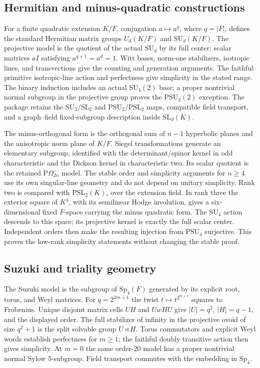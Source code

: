 \documentclass[11pt]{article}
\numberwithin{equation}{section}
\theoremstyle{definition}
\newcommand{\SL}{\mathrm{SL}}
\newcommand{\PSL}{\mathrm{PSL}}
\newcommand{\PSU}{\mathrm{PSU}}
\newcommand{\POm}{\mathrm{P}\Omega}
\begin{document}
\subsection{Hermitian and minus-quadratic constructions}

For a finite quadratic extension $K/F$, conjugation $a\mapsto a^q$,
where $q=|F|$, defines the standard Hermitian matrix groups $U_d(K/F)$
and $\mathrm{SU}_d(K/F)$. The projective model is the quotient of the actual
$\mathrm{SU}_d$ by its full center: scalar matrices $aI$ satisfying
$a^{q+1}=a^d=1$. Witt bases, norm-one stabilizers, isotropic lines,
and transvections give the counting and generation arguments. The
faithful primitive isotropic-line action and perfectness give simplicity
in the stated range. The binary induction includes an actual $\mathrm{SU}_4(2)$
base; a proper nontrivial normal subgroup in the projective group proves
the $\PSU_3(2)$ exception.
The package retains the $\mathrm{SU}_2/\SL_2$ and $\PSU_2/\PSL_2$ maps, compatible
field transport, and a graph--field fixed-subgroup description inside
$\SL_d(K)$.

The minus-orthogonal form is the orthogonal sum of $n-1$ hyperbolic
planes and the anisotropic norm plane of $K/F$.
Siegel transformations generate an elementary subgroup, identified with
the determinant/spinor kernel in odd characteristic and the Dickson
kernel in characteristic two. Its scalar quotient is the retained
$\POm^-_{2n}$ model. The stable order and simplicity arguments for
$n\geq4$ use its own singular-line geometry and do not depend on unitary
simplicity. Rank two is compared with $\PSL_2(K)$, over the extension
field. In rank three the exterior square of $K^4$, with its semilinear
Hodge involution, gives a six-dimensional fixed $F$-space carrying the
minus quadratic form. The $\mathrm{SU}_4$ action descends to this space; its
projective kernel is exactly the full scalar center. Independent orders
then make the resulting injection from $\PSU_4$ surjective. This proves
the low-rank simplicity statements without changing the stable proof.

\subsection{Suzuki and triality geometry}

The Suzuki model is the subgroup of $\mathrm{Sp}_4(F)$ generated by its explicit
root, torus, and Weyl matrices. For $q=2^{2m+1}$ the twist
$t\mapsto t^{2^{m+1}}$ squares to Frobenius. Unique disjoint matrix cells
$UH$ and $UwHU$ give $|U|=q^2$, $|H|=q-1$, and the displayed order.
The full stabilizer of infinity in the projective ovoid of size $q^2+1$
is the split solvable group $U\rtimes H$. Torus commutators and explicit
Weyl words establish perfectness for $m\geq1$; the faithful doubly
transitive action then gives simplicity. At $m=0$ the same order-$20$
model has a proper nontrivial normal Sylow $5$-subgroup. Field transport
commutes with the embedding in $\mathrm{Sp}_4$.
\end{document}
